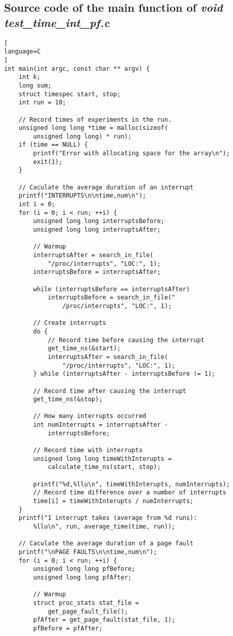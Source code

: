 \begin{appendices}
\chapter{Source code of the main function of \textit{void test\_time\_int\_pf.c}}
\label{app:listingTestInterrupt}

\begin{lstlisting}[
language=C
]
int main(int argc, const char ** argv) {
	int k;
	long sum;
	struct timespec start, stop;
	int run = 10;

	// Record times of experiments in the run.
	unsigned long long *time = malloc(sizeof(
	    unsigned long long) * run);
	if (time == NULL) {
		printf("Error with allocating space for the array\n");
		exit(1);
	}

	// Caculate the average duration of an interrupt
	printf("INTERRUPTS\n\ntime,num\n");
	int i = 0;
	for (i = 0; i < run; ++i) {
		unsigned long long interruptsBefore;
		unsigned long long interruptsAfter;

		// Warmup
		interruptsAfter = search_in_file(
		    "/proc/interrupts", "LOC:", 1);
		interruptsBefore = interruptsAfter;

		while (interruptsBefore == interruptsAfter)
			interruptsBefore = search_in_file("
			    /proc/interrupts", "LOC:", 1);

		// Create interrupts
		do {
		    // Record time before causing the interrupt
			get_time_ns(&start);
			interruptsAfter = search_in_file(
			    "/proc/interrupts", "LOC:", 1);
		} while (interruptsAfter - interruptsBefore != 1);
        
        // Record time after causing the interrupt
		get_time_ns(&stop);
    
        // How many interrupts occurred
		int numInterrupts = interruptsAfter -
		    interruptsBefore;
		    
		// Record time with interrupts
		unsigned long long timeWithInterupts =
		    calculate_time_ns(start, stop);

		printf("%d,%llu\n", timeWithInterupts, numInterrupts);
		// Record time difference over a number of interrupts
		time[i] = timeWithInterupts / numInterrupts;
	}
	printf("1 interrupt takes (average from %d runs):
	    %llu\n", run, average_time(time, run));

	// Caculate the average duration of a page fault
	printf("\nPAGE FAULTS\n\ntime,num\n");
	for (i = 0; i < run; ++i) {
		unsigned long long pfBefore;
		unsigned long long pfAfter;

		// Warmup
		struct proc_stats stat_file =
		    get_page_fault_file();
		pfAfter = get_page_fault(stat_file, 1);
		pfBefore = pfAfter;


\end{lstlisting}
\end{appendices}
